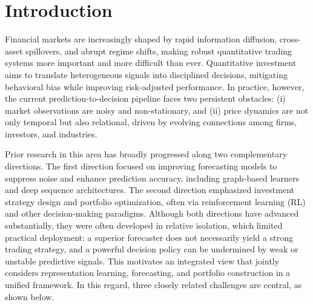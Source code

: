 \documentclass[pdflatex,sn-mathphys-num]{sn-jnl}%
\theoremstyle{thmstyleone}%
\theoremstyle{thmstyletwo}%
\theoremstyle{thmstylethree}%
\begin{document}
\keywords{\textcolor{blue}{graph attention network, Transformer, deep reinforcement learning, portfolio allocation, financial relation graphs, pre-registered evaluation}}



\maketitle

\section{Introduction}\label{sec1}

Financial markets are increasingly shaped by rapid information diffusion, cross-asset spillovers, and abrupt regime shifts, making robust quantitative trading systems more important and more difficult than ever. Quantitative investment aims to translate heterogeneous signals into disciplined decisions, mitigating behavioral bias while improving risk-adjusted performance. In practice, however, the current prediction-to-decision pipeline faces two persistent obstacles: (i) market observations are noisy and non-stationary, and (ii) price dynamics are not only temporal but also relational, driven by evolving connections among firms, investors, and industries.

Prior research in this area has broadly progressed along two complementary directions. The first direction focused on improving forecasting models to suppress noise and enhance prediction accuracy, including graph-based learners and deep sequence architectures. The second direction emphasized investment strategy design and portfolio optimization, often via reinforcement learning (RL) and other decision-making paradigms. Although both directions have advanced substantially, they were often developed in relative isolation, which limited practical deployment: a superior forecaster does not necessarily yield a strong trading strategy, and a powerful decision policy can be undermined by weak or unstable predictive signals. This motivates an integrated view that jointly considers representation learning, forecasting, and portfolio construction in a unified framework. In this regard, three closely related challenges are central, as shown below.
\end{document}
